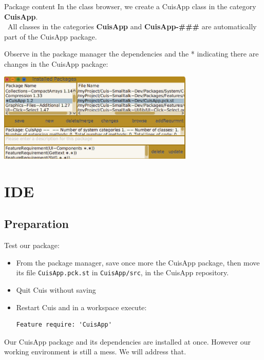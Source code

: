 \documentclass{beamer}
\newcommand{\tip}{\boldmath{\textcolor{red}{$\Rightarrow$}}}
\begin{document}
\begin{frame}{Package content}
  In the class browser, we create a CuisApp class in the category \textbf{CuisApp}.\\
  \tip\ All classes in the categories \textbf{CuisApp} and
  \textbf{CuisApp-\#\#\#} are automatically part of the CuisApp
  package.
  \vspace*{10pt}

  Observe in the package manager the dependencies and the * indicating
  there are changes in the CuisApp package:
  \begin{center}
    \includegraphics[width=0.7\textwidth]{CuisAppPackage.png}
  \end{center}
\end{frame}

\section{IDE}
\subsection{Preparation}
\begin{frame}[fragile]
  Test our package:
    \begin{itemize}
    \item From the package manager, save once more the CuisApp
      package, then move its file \texttt{CuisApp.pck.st} in
      \texttt{CuisApp/src}, in the CuisApp repository.
    \item Quit Cuis without saving
    \item Restart Cuis and in a workspace execute:
\begin{lstlisting}[language=Smalltalk]
Feature require: 'CuisApp'
\end{lstlisting}
\end{itemize}
Our CuisApp package and its dependencies are installed at once.
However our working environment is still a mess. We will address that.
\end{frame}
\end{document}
